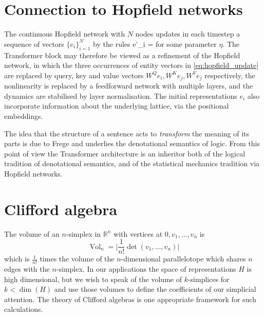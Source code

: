 \documentclass{article} %
\begin{document}
\section{Connection to Hopfield networks}
\label{appendix:hopfield}


The continuous Hopfield network \citep{hopfield} \cite[Ch.42]{mackay} with $N$ nodes updates in each timestep a sequence of vectors $\{ e_i \}_{i=1}^N$ by the rules
\be\label{eq:hopfield_update}
e'_i = 
\ee
for some parameter $\eta$. The Transformer block may therefore be viewed as a refinement of the Hopfield network, in which the three occurrences of entity vectors in \eqref{eq:hopfield_update} are replaced by query, key and value vectors $W^Q e_i, W^K e_j, W^V e_j$ respectively, the nonlinearity is replaced by a feedforward network with multiple layers, and the dynamics are stabilised by layer normalisation. The initial representations $e_i$ also incorporate information about the underlying lattice, via the positional embeddings.

The idea that the structure of a sentence acts to \emph{transform} the meaning of its parts is due to Frege \citep{frege} and underlies the denotational semantics of logic. From this point of view the Transformer architecture is an inheritor both of the logical tradition of denotational semantics, and of the statistical mechanics tradition via Hopfield networks.



\section{Clifford algebra}
\label{appendix:clifford}

The volume of an $n$-simplex in $\mathbb{R}^n$ with vertices at $0,v_1,\ldots,v_n$ is
\[
\operatorname{Vol}_n = \Big| \frac{1}{n!} \det(v_1, \ldots, v_n) \Big|
\]
which is $\tfrac{1}{n!}$ times the volume of the $n$-dimensional parallelotope which shares $n$ edges with the $n$-simplex. In our applications the space of representations $H$ is high dimensional, but we wish to speak of the volume of $k$-simplices for $k < \dim(H)$ and use those volumes to define the coefficients of our simplicial attention. The theory of Clifford algebras \citep{hestenes} is one appropriate framework for such calculations.
\end{document}

